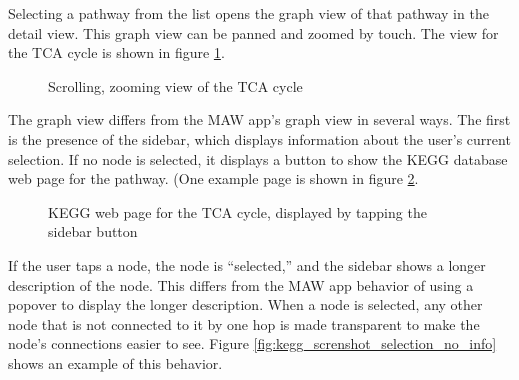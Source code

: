 Selecting a pathway from the list opens the graph view of that pathway in the
detail view. This graph view can be panned and zoomed by touch. The view for
the TCA cycle is shown in figure \ref{fig:kegg_screenshot_pathway}.

\begin{figure}[hbt]
    \caption{\label{fig:kegg_screenshot_pathway} Scrolling, zooming view of
    the TCA cycle}
\end{figure}

The graph view differs from the MAW app's graph view in several ways. The first
is the presence of the sidebar, which displays information about the user's
current selection. If no node is selected, it displays a button to show the KEGG
database web page for the pathway. (One example page is shown in figure
\ref{fig:kegg_screenshot_kegg_web_site}.

\begin{figure}[hbt]
    \caption{\label{fig:kegg_screenshot_kegg_web_site} KEGG web page for the TCA
    cycle, displayed by tapping the sidebar button}
\end{figure}

If the user taps a node, the node is ``selected,'' and the sidebar shows a
longer description of the node.  This differs from the MAW app behavior of using
a popover to display the longer description. When a node is selected, any other
node that is not connected to it by one hop is made transparent to make the
node's connections easier to see.  Figure
\ref{fig:kegg_screnshot_selection_no_info} shows an example of this behavior.

